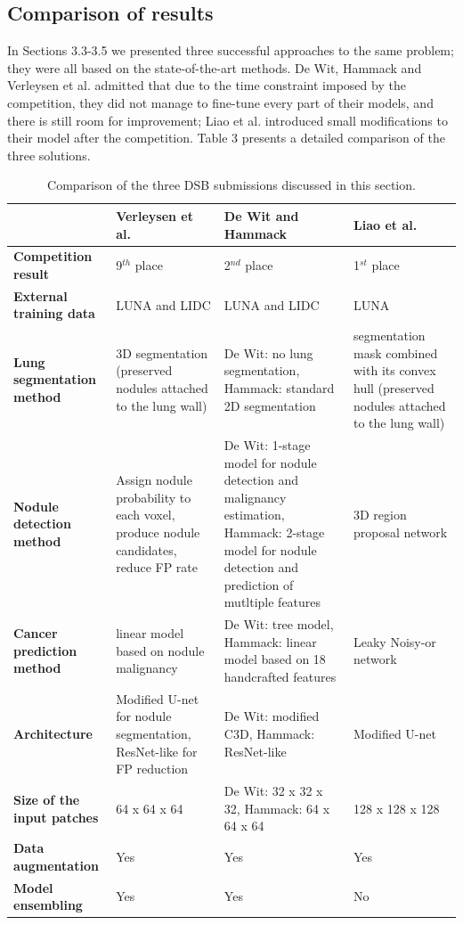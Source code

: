 \documentclass[12pt]{article}
\begin{document}
\subsection{Comparison of results}
In Sections 3.3-3.5 we presented three successful approaches to the same problem; they were all based on the state-of-the-art methods. De Wit, Hammack and Verleysen et al. admitted that due to the time constraint imposed by the competition, they did not manage to fine-tune every part of their models, and there is still room for improvement; Liao et al. introduced small modifications to their model after the competition. 
Table 3 presents a detailed comparison of the three solutions. 

\begin {table}
\caption {Comparison of the three DSB submissions discussed in this section.} \label{tab:title} 
\begin{center}
\begin{footnotesize} 
\begin{tabular}{ | m{2.2cm} |  m{3.9cm} |  m{3.9cm} |  m{3.9cm} | } 
\hline
& \textbf{Verleysen et al.} & \textbf{De Wit and Hammack} & \textbf{Liao et al.}  \\ 
\hline
\textbf{Competition result} & 9$^{th}$ place & 2$^{nd}$ place & 1$^{st}$ place\\
\hline
\textbf{External training data} & LUNA and LIDC & LUNA and LIDC & LUNA  \\ 
\hline
\textbf{Lung segmentation method} & 3D segmentation (preserved nodules attached to the lung wall) & De Wit: no lung segmentation, Hammack: standard 2D segmentation &   segmentation mask combined with its convex hull (preserved nodules attached to the lung wall) \\
\hline
\textbf{Nodule detection method} & Assign nodule probability to each voxel, produce nodule candidates, reduce FP rate  &De Wit: 1-stage model for nodule detection and malignancy estimation, Hammack: 2-stage model for nodule detection and prediction of mutltiple features &  3D region proposal network \\ 
\hline
\textbf{Cancer prediction method} & linear model based on nodule malignancy &De Wit: tree model, Hammack: linear model based on 18 handcrafted features & Leaky Noisy-or network \\
\hline
\textbf{Architecture} & Modified U-net for nodule segmentation, ResNet-like for FP reduction & De Wit: modified C3D, Hammack: ResNet-like & Modified U-net\\
\hline
\textbf{Size of the input patches} & 64 x 64 x 64 & De Wit: 32 x 32 x 32, Hammack: 64 x 64 x 64 & 128 x 128 x 128 \\
\hline
\textbf{Data augmentation}&Yes&Yes&Yes\\
\hline
\textbf{Model ensembling}&Yes&Yes&No\\
\hline 

\end{tabular}
\end{footnotesize}
\end{center}

\end{table}
\end{document}
